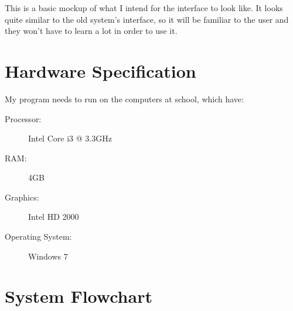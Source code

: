 This is a basic mockup of what I intend for the interface to look like. It looks
quite similar to the old system's interface, so it will be familiar to the user
and they won't have to learn a lot in order to use it.

\section{Hardware Specification}

My program needs to run on the computers at school, which have:
\begin{description}
	\item[Processor:] Intel Core i3 @ 3.3GHz
	\item[RAM:] 4GB
	\item[Graphics:] Intel HD 2000
	\item[Operating System:] Windows 7
\end{description}

\section{System Flowchart}

